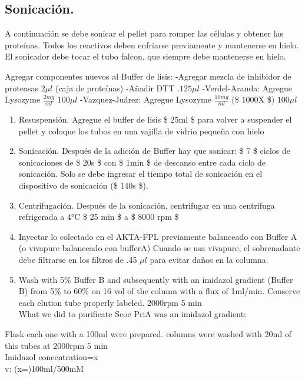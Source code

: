 \documentclass[12pt,twoside]{reedthesis}
\begin{document}
  \subsection{Sonicación.}\label{sonicacion.}
  
  A continuación se debe sonicar el pellet para romper las células y
  obtener las proteínas. Todos los reactivos deben enfriarse previamente y
  mantenerse en hielo. El sonicador debe tocar el tubo falcon, que siempre
  debe mantenerse en hielo.
  
  Agregar componentes nuevos al Buffer de lisis: -Agregar mezcla de
  inhibidor de proteasas \(2\mu l\) (caja de proteínas) -Añadir DTT
  \(.125\mu l\) -Verdel-Aranda: Agregue Lysozyme \(\frac{2mg}{ml}\)
  \(100\mu l\) -Vazquez-Juárez: Agregue Lysozyme \(\frac{10mg}{ml}\) (\$
  1000X \$) \(100\mu l\)
  
  \begin{enumerate}
  \def\labelenumi{\arabic{enumi}.}
  \setcounter{enumi}{1}
  \item
    Resuspensión. Agregue el buffer de lisis \$ 25ml \$ para volver a
    suspender el pellet y coloque los tubos en una vajilla de vidrio
    pequeña con hielo
  \item
    Sonicación. Después de la adición de Buffer hay que sonicar: \$ 7 \$
    ciclos de sonicaciones de \$ 20s \$ con \$ 1min \$ de descanso entre
    cada ciclo de sonicación. Solo se debe ingresar el tiempo total de
    sonicación en el dispositivo de sonicación (\$ 140s \$).
  \item
    Centrifugación. Después de la sonicación, centrifugar en una
    centrífuga refrigerada a 4°C \$ 25 min \$ a \$ 8000 rpm \$
  \item
    Inyectar lo colectado en el AKTA-FPL previamente balanceado con Buffer
    A (o vivapure balanceado con bufferA) Cuando se usa vivapure, el
    sobrenadante debe filtrarse en los filtros de .45 \(\mu l\) para
    evitar daños en la columna.
  \item
    Wash with 5\% Buffer B and subsequently with an imidazol gradient
    (Buffer B) from 5\% to 60\% on 16 vol of the column with a flux of
    1ml/min. Conserve each elution tube properly labeled. 2000rpm 5 min\\
    What we did to purificate Scoe PriA was an imidazol gradient:
  \end{enumerate}
  
  Flask each one with a 100ml were prepared. columns were washed with 20ml
  of this tubes at 2000rpm 5 min\\
  Imidazol concentration=x\\
  v: (x=)100ml/500mM
  
\end{document}
